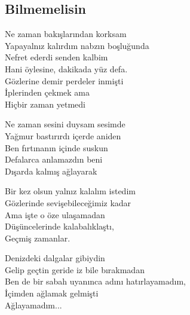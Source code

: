 \subsection{Bilmemelisin}

Ne zaman bakışlarından korksam \\
Yapayalnız kalırdım nabzın boşluğunda \\
Nefret ederdi senden kalbim \\
Hani öylesine, dakikada yüz defa. \\
Gözlerine demir perdeler inmişti \\
İplerinden çekmek ama \\
Hiçbir zaman yetmedi

\noindent\newline
Ne zaman sesini duysam sesimde \\
Yağmur bastırırdı içerde aniden \\
Ben fırtınanın içinde suskun \\
Defalarca anlamazdın beni \\
Dışarda kalmış ağlayarak

\noindent\newline
Bir kez olsun yalnız kalalım istedim \\
Gözlerinde sevişebileceğimiz kadar \\
Ama işte o öze ulaşamadan \\
Düşüncelerinde kalabalıklaştı, \\
Geçmiş zamanlar.

\noindent\newline
Denizdeki dalgalar gibiydin \\
Gelip geçtin geride iz bile bırakmadan \\
Ben de bir sabah uyanınca adını hatırlayamadım, \\
İçimden ağlamak gelmişti \\
Ağlayamadım...